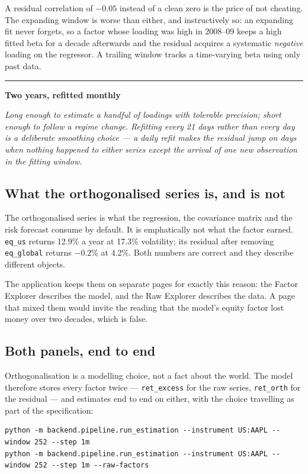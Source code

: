 \documentclass[11pt,a4paper]{article}
\newenvironment{decision}[1]
  {\par\vspace{1.7ex}%
   \begin{lrbox}{\decisionbox}\begin{minipage}{\textwidth}%
   {\color{rule}\rule{\textwidth}{0.4pt}}\par\vspace{0.7ex}
   {\small\sffamily\bfseries\color{navy}#1}\par\vspace{0.35ex}
   \small\itshape}
  {\par\vspace{0.7ex}\noindent{\color{rule}\rule{\textwidth}{0.4pt}}%
   \end{minipage}\end{lrbox}%
   \noindent\usebox{\decisionbox}\par\vspace{1.7ex}}
\newcommand{\code}[1]{\texttt{\small #1}}
\begin{document}
A residual correlation of $-0.05$ instead of a clean zero is the price of not
cheating. The expanding window is worse than either, and instructively so: an
expanding fit never forgets, so a factor whose loading was high in 2008--09 keeps a
high fitted beta for a decade afterwards and the residual acquires a systematic
\emph{negative} loading on the regressor. A trailing window tracks a time-varying
beta using only past data.

\begin{decision}{Two years, refitted monthly}
Long enough to estimate a handful of loadings with tolerable precision; short enough
to follow a regime change. Refitting every 21 days rather than every day is a
deliberate smoothing choice --- a daily refit makes the residual jump on days when
nothing happened to either series except the arrival of one new observation in the
fitting window.
\end{decision}

\subsection{What the orthogonalised series is, and is not}

The orthogonalised series is what the regression, the covariance matrix and the risk
forecast consume by default. It is emphatically not what the factor earned.
\code{eq\_us} returns 12.9\% a year at 17.3\% volatility; its residual after removing
\code{eq\_global} returns $-0.2$\% at 4.2\%. Both numbers are correct and they
describe different objects.

The application keeps them on separate pages for exactly this reason: the Factor
Explorer describes the model, and the Raw Explorer describes the data. A page that
mixed them would invite the reading that the model's equity factor lost money over
two decades, which is false.

\subsection{Both panels, end to end}
\label{sec:bothpanels}

Orthogonalisation is a modelling choice, not a fact about the world. The model
therefore stores every factor twice --- \code{ret\_excess} for the raw series,
\code{ret\_orth} for the residual --- and estimates end to end on either, with the
choice travelling as part of the specification:

\begin{lstlisting}
python -m backend.pipeline.run_estimation --instrument US:AAPL --window 252 --step 1m
python -m backend.pipeline.run_estimation --instrument US:AAPL --window 252 --step 1m --raw-factors
\end{lstlisting}
\end{document}
